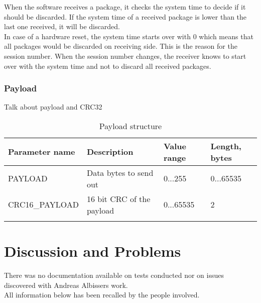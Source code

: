 When the software receives a package, it checks the system time to decide if it should be discarded. If the system time of a received package is lower than the last one received, it will be discarded.\\
In case of a hardware reset, the system time starts over with 0 which means that all packages would be discarded on receiving side. This is the reason for the session number. When the session number changes, the receiver knows to start over with the system time and not to discard all received packages.\\
%
\subsubsection{Payload}
Talk about payload and CRC32
%
%
\begin{center}
    \begin{longtable}{p{3cm}p{8cm}p{2cm}p{1cm}}
        \hline
        \textbf{Parameter name} & \textbf{Description} & \textbf{Value range} & \textbf{Length, bytes} \\
        \hline
        PAYLOAD & Data bytes to send out & 0...255 & 0...65535\\
        \hline
        CRC16\_PAYLOAD &  16 bit CRC of the payload & 0...65535 & 2\\
        \hline
        \caption{Payload structure}
        \label{Payload structure}    
    \end{longtable}
\end{center}
%
%
%
%
%
\section{Discussion and Problems} \label{Teensy 3.1 software problems}
There was no documentation available on tests conducted nor on issues discovered with Andreas Albissers work.\\
All information below has been recalled by the people involved.\\
%
%
